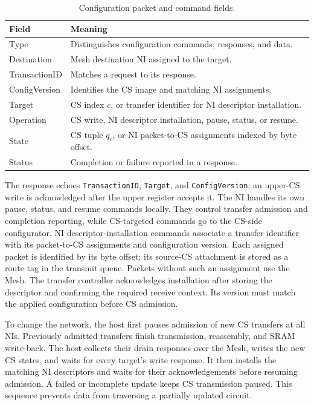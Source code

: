 \documentclass[conference,10pt]{IEEEtran}
\begin{document}
\begin{table}[!t]
  \caption{Configuration packet and command fields.}
  \label{tab:noc-command-fields}
  \centering
  \small
  \begin{tabularx}{\columnwidth}{@{}p{}>{\raggedright\arraybackslash}X@{}}
    \hline
    Field & Meaning \\
    \hline
    Type & Distinguishes configuration commands, responses, and data. \\
    Destination & Mesh destination NI assigned to the target. \\
    TransactionID & Matches a request to its response. \\
    ConfigVersion & Identifies the CS image and matching NI assignments. \\
    Target & CS index $c$, or transfer identifier for NI descriptor installation. \\
    Operation & CS write, NI descriptor installation, pause, status, or resume. \\
    State & CS tuple $q_c$, or NI packet-to-CS assignments indexed by byte offset. \\
    Status & Completion or failure reported in a response. \\
    \hline
  \end{tabularx}
\end{table}

The response echoes \texttt{TransactionID}, \texttt{Target}, and
\texttt{ConfigVersion};
an upper-CS write is acknowledged after the upper register accepts it.
The NI handles its own pause, status, and resume commands locally.
They control transfer admission and completion reporting, while
CS-targeted commands go to the CS-side configurator.
NI descriptor-installation commands associate a transfer identifier
with its packet-to-CS assignments and configuration version.
Each assigned packet is identified by its byte offset; its source-CS
attachment is stored as a route tag in the transmit queue. Packets
without such an assignment use the Mesh.
The transfer controller acknowledges installation after storing the
descriptor and confirming the required receive context. Its version
must match the applied configuration before CS admission.

To change the network, the host first pauses admission of new CS
transfers at all NIs. Previously admitted transfers finish transmission,
reassembly, and SRAM write-back. The host collects their drain responses
over the Mesh, writes the new CS states, and waits for every target's
write response. It then installs the matching NI descriptors and waits
for their acknowledgements before resuming admission.
A failed or incomplete update
keeps CS transmission paused. This sequence prevents data from
traversing a partially updated circuit.
\end{document}
